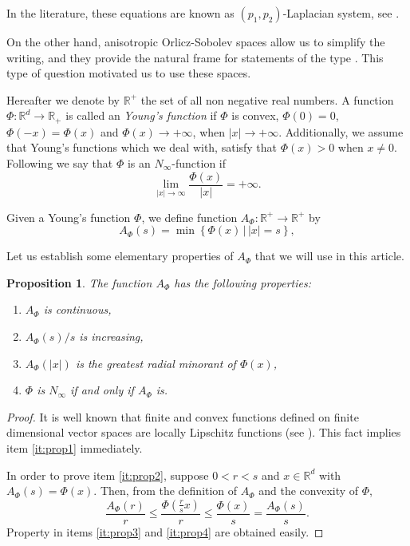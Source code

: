 \documentclass[twoside]{article}
\newtheorem{prop}[thm]{Proposition}
\theoremstyle{remark}
\newcommand{\rr}{\mathbb{R}}
\renewcommand{\leq}{\leqslant}
\begin{document}
In the literature, these equations are known as $(p_1,p_2)$-Laplacian system, see
\cite{yang2013existence,pasca2016periodic,yang2012periodic,pasca2010periodic,pacsca2010some,pasca2011some}.


On the other hand, anisotropic Orlicz-Sobolev spaces allow us to simplify the writing, and they provide the natural frame for statements of the type \cite[Lemma 3.1]{Tian2007192}. This type of question motivated us to use these spaces.

Hereafter we denote  by $\mathbb{R}^+$  the set of all non negative real numbers. A function $\Phi:\mathbb{R}^d\to \mathbb{R}_+ $ is called an \emph{Young's function} if $\Phi$ is convex, $\Phi(0)=0$, $\Phi(-x)=\Phi(x)$ and $\Phi(x)\to +\infty$, when $|x|\to+\infty$. Additionally, we assume that  Young's functions which we deal with, satisfy that $\Phi(x)>0$ when $x\neq 0$. Following \cite{Orliczvectorial2005} we say that $\Phi$ is an $N_{\infty}$-function  if
\[\lim_{|x|\to\infty}\frac{\Phi(x)}{|x|}=+\infty.\]

Given a Young's function $\Phi$, we define function $A_{\Phi}:\rr^+\to\rr^+$ by
\begin{equation}\label{eq:inversa-gral}
A_{\Phi}(s)=\min\left\{\Phi(x)\,\big|\,|x|=s\right\},
\end{equation}

Let us establish some elementary properties of $A_{\Phi}$ that we will use in this article.
\begin{prop}\label{prop:AsubPhi} The function $A_{\Phi}$ has the following properties:
\begin{enumerate}
 \item\label{it:prop1} $A_{\Phi}$ is continuous,
 \item\label{it:prop2} $A_{\Phi}(s)/s$ is increasing,
 \item\label{it:prop3} $A_{\Phi}(|x|)$ is the \emph{greatest radial minorant} of 
 $\Phi(x)$,
 \item\label{it:prop4} $\Phi$ is $N_{\infty}$ if and only if $A_{\Phi}$ is.
\end{enumerate}
\end{prop}

\begin{proof} It is well known that finite and convex functions defined on finite dimensional 
vector spaces are locally Lipschitz functions (see \cite{clarke2013functional}). This fact 
implies item \ref{it:prop1} immediately. 

In order to prove item \ref{it:prop2}, suppose $0<r<s$ and $x\in\rr^d$ with $A_{\Phi}(s)
=\Phi(x)$. Then, from the definition of $A_{\Phi}$ and the convexity of $\Phi$,
\[\frac{A_{\Phi}(r)}{r}\leq \frac{\Phi\left(\frac{r}{s}x\right)}{r}\leq \frac{\Phi\left(x\right)}{s}=
 \frac{A_{\Phi}(s)}{s}.
\]
Property in items \ref{it:prop3} and \ref{it:prop4} are obtained easily.

 
\end{proof}
\end{document}
